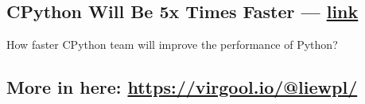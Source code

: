\begin{multicols}{2}
\subsection{{CPython Will Be 5x Times Faster --- \href{https://virgool.io/@liewpl/cpython-five-times-faster-p5jve4zzywog}{link}}}
\begin{zitemize}
\item How faster CPython team will improve the performance of Python?
\end{zitemize}

\subsection{{More in here: \href{https://virgool.io/@liewpl/}{https://virgool.io/@liewpl/}}}

\end{multicols}